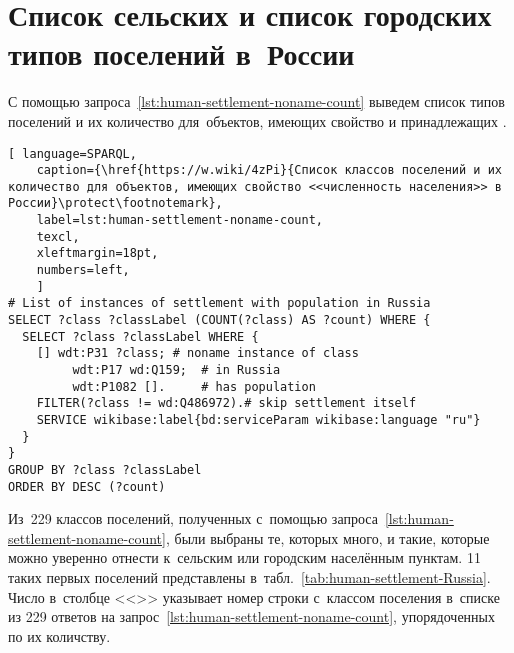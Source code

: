 \newpage
\section{Список сельских и список городских типов поселений в~России}%
\label{sec:list-village-city-types-in-Russia}

С помощью запроса~\ref{lst:human-settlement-noname-count} 
выведем список типов поселений и их количество для~объектов, 
имеющих свойство  
и принадлежащих . 

\begin{lstlisting}[ language=SPARQL, 
    caption={\href{https://w.wiki/4zPi}{Список классов поселений и их количество для объектов, имеющих свойство <<численность населения>> в России}\protect\footnotemark},
    label=lst:human-settlement-noname-count,
    texcl,
    xleftmargin=18pt, 
    numbers=left,
    ]
# List of instances of settlement with population in Russia
SELECT ?class ?classLabel (COUNT(?class) AS ?count) WHERE {
  SELECT ?class ?classLabel WHERE {
    [] wdt:P31 ?class; # noname instance of class
         wdt:P17 wd:Q159;  # in Russia
         wdt:P1082 [].     # has population
    FILTER(?class != wd:Q486972).# skip settlement itself
    SERVICE wikibase:label{bd:serviceParam wikibase:language "ru"}
  }
}
GROUP BY ?class ?classLabel
ORDER BY DESC (?count)
\end{lstlisting}%

Из~229 классов поселений, полученных с~помощью запроса~\ref{lst:human-settlement-noname-count}, 
были выбраны те, которых много, 
и такие, которые можно уверенно отнести к~сельским или городским населённым пунктам. 
11 таких первых поселений 
представлены в~табл.~\ref{tab:human-settlement-Russia}. 
    Число в~столбце <<\textnumero>> указывает номер строки с~классом поселения 
    в~списке из 229 ответов на запрос~\ref{lst:human-settlement-noname-count}, 
    упорядоченных по их количству.



